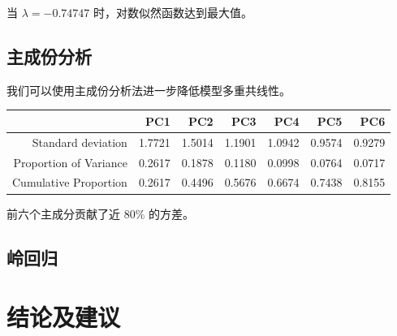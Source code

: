 \documentclass[fontset=ubuntu]{ctexart}
\begin{document}
            当 $\lambda = -0.74747$ 时，对数似然函数达到最大值。

        \subsection{主成份分析}
            我们可以使用主成份分析法进一步降低模型多重共线性。
            \begin{table}[ht]
                \centering
                \begin{tabular}{rrrrrrr}
                    \hline
                    & PC1 & PC2 & PC3 & PC4 & PC5 & PC6 \\ 
                    \hline
                    Standard deviation & 1.7721 & 1.5014 & 1.1901 & 1.0942 & 0.9574 & 0.9279 \\ 
                    Proportion of Variance & 0.2617 & 0.1878 & 0.1180 & 0.0998 & 0.0764 & 0.0717  \\ 
                    Cumulative Proportion & 0.2617 & 0.4496 & 0.5676 & 0.6674 & 0.7438 & 0.8155 \\ 
                    \hline
                \end{tabular}
            \end{table}
            
            前六个主成分贡献了近 $80\%$ 的方差。

        \subsection{岭回归}
            
    \section{结论及建议}

    \newpage
\end{document}
